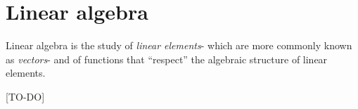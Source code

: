 \chapter{Linear algebra}
\label{ch::lin_alg}

\begin{comment}
\textbf{This chapter uses some unconventional notation.} The unconventional notation will be introduced in a natural way, so there is no need to know any of it now. This is just a ``heads up'' for those who have experience with linear algebra. Here is the list of unconventional notation used in this chapter:

\begin{itemize}
    \item Unconventional combinations of symbols are used, such as:
    \begin{itemize}
        \item ``$\ff(E)$'' (this denotes a function acting on a list of vectors)
        \item ``$[\ff(E)]_F$'' (this is explicit notation for a matrix relative to bases) \item ``$\ff_{E,F}$'' (you'll have to find out!)
    \end{itemize}
    \item To notate the $i$th component of a vector $\vv$ relative to a basis $E$, we write $([\vv]_E)_i$ instead of $v_i$. This notation may seem unnecessarily verbose, but it has the advantage of making any involvement of bases apparent.
\end{itemize}


\vspace{.25cm}

\textbf{Notation for covariance and contravariance is not used in this chapter.} The use of both upper and lower indices to distinguish between ``covariant'' and ``contravariant'' will not be used in the following chapter of linear algebra review to prevent confusion. Only lower indices will be used. (If you don't know what ``covariant'' or ``contravariant'' means, that is 100\% expected. Covariance and contravariance are explained later).
\end{comment}

Linear algebra is the study of \textit{linear elements}- which are more commonly known as \textit{vectors}- and of functions that ``respect'' the algebraic structure of linear elements.

[TO-DO]

\newpage

